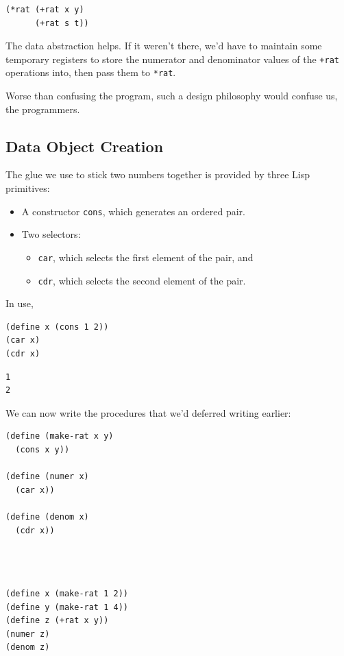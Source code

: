 \documentclass[9pt]{report}
\begin{document}
\begin{verbatim}
(*rat (+rat x y)
      (+rat s t))
\end{verbatim}

The data abstraction helps. If it weren't there, we'd have to
maintain some temporary registers to store the numerator and
denominator values of the \texttt{+rat} operations into, then pass them to
\texttt{*rat}.

Worse than confusing the program, such a design philosophy would
confuse us, the programmers.

\subsection{Data Object Creation}
\label{sec:org4a31830}

The glue we use to stick two numbers together is provided by three
Lisp primitives:
\begin{itemize}
\item A constructor \texttt{cons}, which generates an ordered pair.
\item Two selectors:
\begin{itemize}
\item \texttt{car}, which selects the first element of the pair, and
\item \texttt{cdr}, which selects the second element of the pair.
\end{itemize}
\end{itemize}

In use,
\begin{verbatim}
(define x (cons 1 2))
(car x)
(cdr x)
\end{verbatim}

\begin{verbatim}
1
2
\end{verbatim}


We can now write the procedures that we'd deferred writing
earlier:

\begin{verbatim}
(define (make-rat x y)
  (cons x y))

(define (numer x)
  (car x))

(define (denom x)
  (cdr x))
\end{verbatim}

\begin{verbatim}



(define x (make-rat 1 2))
(define y (make-rat 1 4))
(define z (+rat x y))
(numer z)
(denom z)
\end{verbatim}
\end{document}
